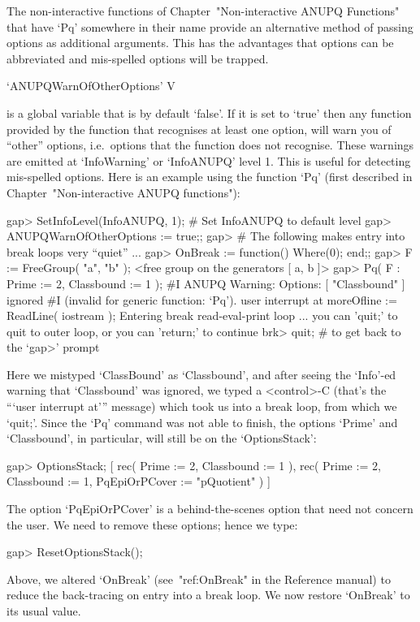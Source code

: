 The   non-interactive   functions   of   Chapter~"Non-interactive   ANUPQ
Functions" that have `Pq' somewhere in their name provide an  alternative
method  of  passing  options  as  additional  arguments.  This  has   the
advantages that options can be abbreviated and mis-spelled  options  will
be trapped.

\>`ANUPQWarnOfOtherOptions' V

is a global variable that is by default `false'. If it is set  to  `true'
then any function provided by the {\ANUPQ} function  that  recognises  at
least one option, will warn you of ``other'' options,  i.e.~options  that
the  function  does  not  recognise.  These  warnings  are   emitted   at
`InfoWarning' or `InfoANUPQ'  level  1.  This  is  useful  for  detecting
mis-spelled options. Here is an example using the  function  `Pq'  (first
described in Chapter~"Non-interactive ANUPQ functions"):

\begintt
gap> SetInfoLevel(InfoANUPQ, 1);        # Set InfoANUPQ to default level
gap> ANUPQWarnOfOtherOptions := true;;
gap> # The following makes entry into break loops very ``quiet'' ...
gap> OnBreak := function() Where(0); end;;
gap> F := FreeGroup( "a", "b" );
<free group on the generators [ a, b ]>
gap> Pq( F : Prime := 2, Classbound := 1 );
#I  ANUPQ Warning: Options: [ "Classbound" ] ignored
#I  (invalid for generic function: `Pq').
user interrupt at
moreOfline := ReadLine( iostream );
Entering break read-eval-print loop ...
you can 'quit;' to quit to outer loop, or
you can 'return;' to continue
brk> quit; # to get back to the `gap>' prompt
\endtt

Here we mistyped `ClassBound'  as  `Classbound',  and  after  seeing  the
`Info'-ed warning that `Classbound' was ignored, we typed  a  <control>-C
(that's the ```user interrupt at''' message) which took us into  a  break
loop, from which we `quit;'. Since the  `Pq'  command  was  not  able  to
finish, the options `Prime' and `Classbound', in particular,  will  still
be on the `OptionsStack':

\begintt
gap> OptionsStack;
[ rec( Prime := 2, Classbound := 1 ), 
  rec( Prime := 2, Classbound := 1, PqEpiOrPCover := "pQuotient" ) ]
\endtt

The option `PqEpiOrPCover' is a behind-the-scenes option  that  need  not
concern the user. We need to remove these options; hence we type:

\begintt
gap> ResetOptionsStack();
\endtt

Above, we altered `OnBreak' (see~"ref:OnBreak" in the  Reference  manual)
to reduce the back-tracing on entry into a break  loop.  We  now  restore
`OnBreak' to its usual value.

